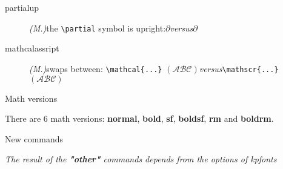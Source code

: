 \documentclass[a4paper,11pt]{christophe}
\newcommand{\versus}{\;\textit{versus}\;}
\begin{document}
\begin{description}
  \item[partialup]\textit{(M.)}\quad the \verb=\partial= symbol is upright:\quad$\partialup$\versus$\partial$
  \item[mathcalassript]\textit{(M.)}\quad swaps between: 
       \verb=\mathcal{...}= $(\mathcal{ABC})$\versus\verb=\mathscr{...}= $(\mathscr{ABC})$
\end{description}

\vfill

\begin{center}
\textsf{\Large Math versions}
\end{center}

There are 6 math versions: \textbf{normal}, \textbf{bold}, \textbf{sf}, \textbf{boldsf}, \textbf{rm} and \textbf{boldrm}.

\vfill

\begin{center}
\textsf{\Large New commands}
\end{center}

\begin{center}
\textit{\small The result of the \textbf{"other"} commands depends from the options of \textit{kpfonts}}
\end{center}
\end{document}
